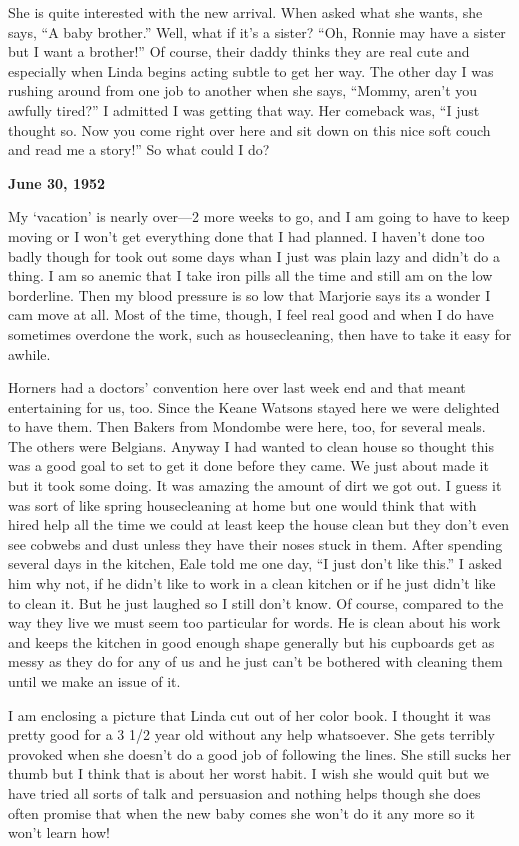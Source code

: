 \documentclass[]{book}
\begin{document}
She is quite interested with the new arrival. When asked what she wants, she says, ``A baby brother.'' Well, what if it's a sister? ``Oh, Ronnie may have a sister but I want a brother!'' Of course, their daddy thinks they are real cute and especially when Linda begins acting subtle to get her way. The other day I was rushing around from one job to another when she says, ``Mommy, aren't you awfully tired?'' I admitted I was getting that way. Her comeback was, ``I just thought so. Now you come right over here and sit down
on this nice soft couch and read me a story!'' So what could I do?

\textbf{June 30, 1952}

My `vacation' is nearly over---2 more weeks to go, and I am going to have to keep moving or I won't get everything done that I had planned. I haven't done too badly though for took out some days whan I just was plain lazy and didn't do a thing. I am so anemic that I take iron pills all the time and still am on the low borderline. Then my blood pressure is so low that Marjorie says its a wonder I cam move at all. Most of the time, though, I feel real good and when I do have sometimes overdone the work, such as housecleaning, then have to take it easy for awhile.

Horners had a doctors' convention here over last week end and that meant entertaining for us, too. Since the Keane Watsons stayed here we were delighted to have them. Then Bakers from Mondombe were here, too, for several meals. The others were Belgians. Anyway I had wanted to clean house so thought this was a good goal to set to get it done before they came. We just about made it but it took some doing. It was amazing the amount of dirt we got out. I guess it was sort of like spring housecleaning at home but one would think that with hired help all the time we could at least keep the house clean but they don't even see cobwebs and dust unless they have their noses stuck in them. After spending several days in the kitchen, Eale told me one day, ``I just don't like this.'' I asked him why not, if he didn't like to work in a clean kitchen or if he just didn't like to clean it. But he just laughed so I still don't know. Of course, compared to the way they live we must seem too particular for words. He is clean about his work and keeps the kitchen in good enough shape generally but his cupboards get as messy as they do for any of us and he just can't be bothered with cleaning them until we make an issue of it.

I am enclosing a picture that Linda cut out of her color book. I thought it was pretty good for a 3 1/2 year old without any help whatsoever. She gets terribly provoked when she doesn't do a good job of following the lines. She still sucks her thumb but I think that is about her worst habit. I wish she would quit but we have tried all sorts of talk and persuasion and nothing helps though she does often promise that when the new baby comes she won't do it any more so it won't learn how!
\end{document}
